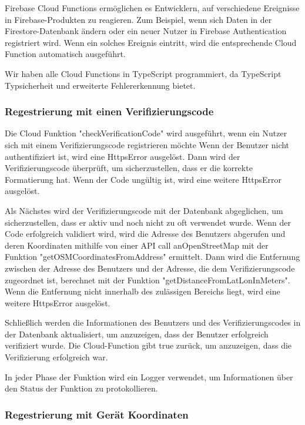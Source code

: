 Firebase Cloud Functions ermöglichen es Entwicklern, auf verschiedene Ereignisse in Firebase-Produkten zu reagieren. Zum Beispiel, wenn sich Daten in der Firestore-Datenbank ändern oder ein neuer Nutzer in Firebase Authentication registriert wird. Wenn ein solches Ereignis eintritt, wird die entsprechende Cloud Function automatisch ausgeführt.

Wir haben alle Cloud Functions in TypeScript programmiert,
da TypeScript Typsicherheit und erweiterte Fehlererkennung
bietet.


\subsubsection{Regestrierung mit einen Verifizierungscode}
\author{Martin Hausleitner}

Die Cloud Funktion "checkVerificationCode" wird ausgeführt, wenn ein Nutzer sich mit einem Verifizierungscode registrieren möchte Wenn der Benutzer nicht authentifiziert ist, wird eine HttpsError ausgelöst. Dann wird der Verifizierungscode überprüft, um sicherzustellen, dass er die korrekte Formatierung hat. Wenn der Code ungültig ist, wird eine weitere HttpsError ausgelöst.

Als Nächstes wird der Verifizierungscode mit der Datenbank
abgeglichen, um sicherzustellen, dass er aktiv und noch
nicht zu oft verwendet wurde. Wenn der Code erfolgreich
validiert wird, wird die Adresse des Benutzers abgerufen und
deren Koordinaten mithilfe von einer API call
anOpenStreetMap mit der Funktion "getOSMCoordinatesFromAddress"
ermittelt. Dann wird die Entfernung zwischen der Adresse des
Benutzers und der Adresse, die dem Verifizierungscode
zugeordnet ist, berechnet mit der Funktion "getDistanceFromLatLonInMeters". Wenn die Entfernung nicht
innerhalb des zulässigen Bereichs liegt, wird eine weitere
HttpsError ausgelöst.

Schließlich werden die Informationen des Benutzers und des
Verifizierungscodes in der Datenbank aktualisiert, um
anzuzeigen, dass der Benutzer erfolgreich verifiziert wurde.
Die Cloud-Function gibt true zurück, um anzuzeigen, dass die
Verifizierung erfolgreich war.

In jeder Phase der Funktion wird ein Logger verwendet, um Informationen über den Status der Funktion zu protokollieren.

\subsubsection{Regestrierung mit Gerät Koordinaten}
\author{Martin Hausleitner}

